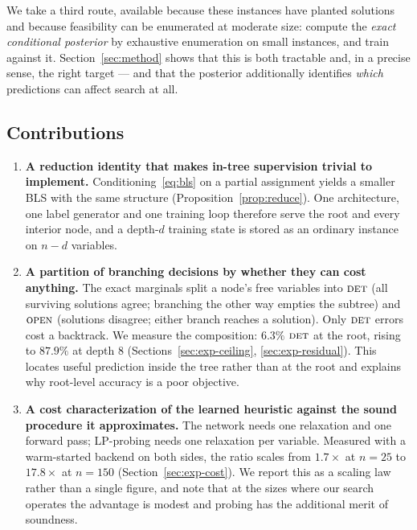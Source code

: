 \documentclass[final,5p,times,twocolumn]{elsarticle}
\newcommand{\FORCED}{\textsc{det}}
\newcommand{\FREE}{\textsc{open}}
\begin{document}
We take a third route, available because these instances have planted solutions and because feasibility can be enumerated at moderate size: compute the \emph{exact conditional posterior} by exhaustive enumeration on small instances, and train against it. Section~\ref{sec:method} shows that this is both tractable and, in a precise sense, the right target --- and that the posterior additionally identifies \emph{which} predictions can affect search at all.

\subsection{Contributions}

\begin{enumerate}
\item \textbf{A reduction identity that makes in-tree supervision trivial to implement.} Conditioning~\eqref{eq:bls} on a partial assignment yields a smaller BLS with the same structure (Proposition~\ref{prop:reduce}). One architecture, one label generator and one training loop therefore serve the root and every interior node, and a depth-$d$ training state is stored as an ordinary instance on $n-d$ variables.

\item \textbf{A partition of branching decisions by whether they can cost anything.} The exact marginals split a node's free variables into $\FORCED$ (all surviving solutions agree; branching the other way empties the subtree) and $\FREE$ (solutions disagree; either branch reaches a solution). Only $\FORCED$ errors cost a backtrack. We measure the composition: $6.3\%$ $\FORCED$ at the root, rising to $87.9\%$ at depth $8$ (Sections~\ref{sec:exp-ceiling}, \ref{sec:exp-residual}). This locates useful prediction inside the tree rather than at the root and explains why root-level accuracy is a poor objective.

\item \textbf{A cost characterization of the learned heuristic against the sound procedure it approximates.} The network needs one relaxation and one forward pass; LP-probing needs one relaxation per variable. Measured with a warm-started backend on both sides, the ratio scales from $1.7\times$ at $n=25$ to $17.8\times$ at $n=150$ (Section~\ref{sec:exp-cost}). We report this as a scaling law rather than a single figure, and note that at the sizes where our search operates the advantage is modest and probing has the additional merit of soundness.


\end{enumerate}
\end{document}

